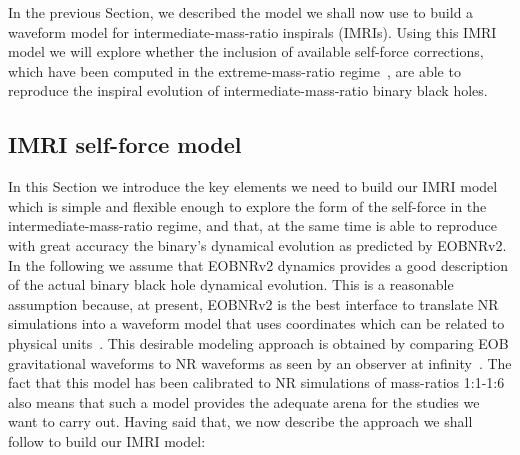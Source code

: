  In the previous Section, we described the model we shall now use to build a waveform model for intermediate-mass-ratio inspirals (IMRIs). Using this IMRI model we will explore whether the inclusion of available self-force corrections, which have been computed in the extreme-mass-ratio regime~\cite{baracknewphi,sago,inner}, are able to reproduce the inspiral evolution of intermediate-mass-ratio binary black holes. 
 
 
 \subsection{IMRI self-force model}
 
 In this Section we introduce the key elements we need to build our IMRI model which is simple and flexible enough to explore the form of the self-force in the intermediate-mass-ratio regime, and that, at the same time is able to reproduce with great accuracy the binary's dynamical evolution as predicted by EOBNRv2. In the following we assume that EOBNRv2 dynamics provides a good description of the actual binary black hole dynamical evolution. This is a reasonable assumption because, at present, EOBNRv2 is the best interface to translate NR simulations into a waveform model that uses coordinates which can be related to physical units~\cite{damsh}. This desirable modeling approach is obtained by comparing EOB gravitational waveforms to NR waveforms as seen by an observer at infinity~\cite{NRPNComparisonBoyleetal}.  The fact that this model has been calibrated to NR simulations of mass-ratios 1:1-1:6 also means that such a model provides the adequate arena for the studies we want to carry out.  Having said that, we now describe 
the approach we shall follow to build our IMRI model:
 

